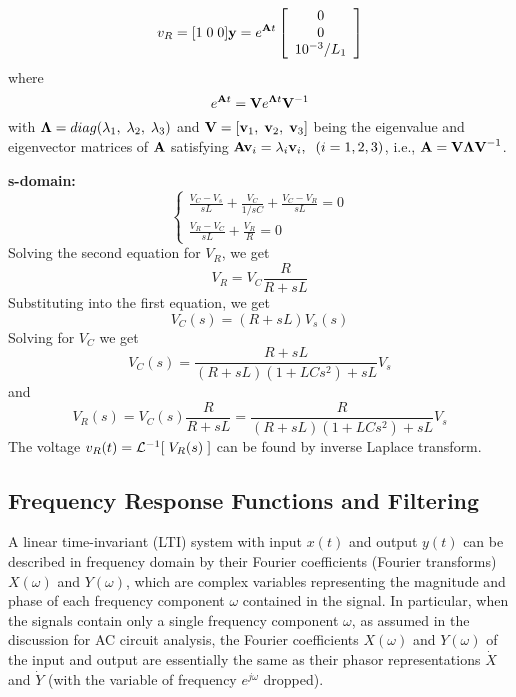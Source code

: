 \documentclass{article}
\begin{document}
\begin{equation}
  v_R=[1\;0\;0]{\bf y}=e^{{\bf A}t}
  \left[\begin{array}{c}0\\0\\10^{-3}/L_1\end{array}\right]
\end{equation}
where 
\begin{equation}
  e^{{\bf A}t}={\bf V}e^{{\bf\Lambda}t}{\bf V}^{-1}
\end{equation}
with ${\bf\Lambda}=diag(\lambda_1,\;\lambda_2,\;\lambda_3)$ and
${\bf V}=[{\bf v}_1,\;{\bf v}_2,\;{\bf v}_3]$ being the eigenvalue 
and eigenvector matrices of ${\bf A}$ satisfying 
${\bf Av}_i=\lambda_i{\bf v}_i,\;\;(i=1,2,3)$, i.e., 
${\bf A}={\bf V\Lambda V}^{-1}$.



{\bf s-domain:}
\begin{equation}
  \left\{
  \begin{array}{l}
    \frac{V_C-V_s}{sL}+\frac{V_C}{1/sC}+\frac{V_C-V_R}{sL}=0\\
    \frac{V_R-V_C}{sL}+\frac{V_R}{R}=0
  \end{array}\right.
\end{equation}
Solving the second equation for $V_R$, we get
\begin{equation}
  V_R=V_C\frac{R}{R+sL}
\end{equation}
Substituting into the first equation, we get
\begin{equation}
  [(R+sL)(1+LC s^2)+sL]V_C(s)=(R+sL)V_s(s)
\end{equation}
Solving for $V_C$ we get
\begin{equation}
  V_C(s)=\frac{R+sL}{(R+sL)(1+LCs^2)+sL}V_s
\end{equation}
and
\begin{equation}
  V_R(s)=V_C(s)\frac{R}{R+sL}=\frac{R}{(R+sL)(1+LCs^2)+sL}V_s
\end{equation}
The voltage $v_R(t)={\cal L}^{-1}[\;V_R(s)\;]$ can be found
by inverse Laplace transform.

\subsection*{Frequency Response Functions and Filtering}

A linear time-invariant (LTI) system with input $x(t)$ and output $y(t)$ 
can be described in frequency domain by their Fourier coefficients 
(Fourier transforms) $X(\omega)$ and $Y(\omega)$,  which are complex 
variables representing the magnitude and phase of each frequency component 
$\omega$ contained in the signal. In particular, when the signals contain 
only a single frequency component $\omega$, as assumed in the discussion 
for AC circuit analysis, the Fourier coefficients $X(\omega)$ and $Y(\omega)$ 
of the input and output are essentially the same as their phasor representations
$\dot{X}$ and $\dot{Y}$ (with the variable of frequency $e^{j\omega}$ dropped).
\end{document}
